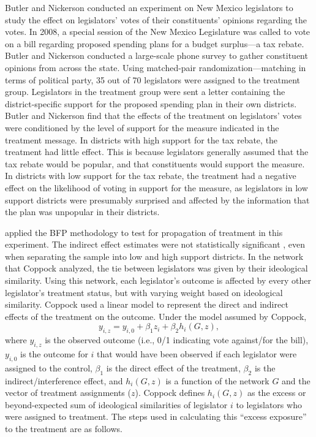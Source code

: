 \documentclass[12pt]{article}
\begin{document}
Butler and Nickerson conducted an experiment on New Mexico legislators to study the effect on legislators' votes of their constituents' opinions regarding the votes. In 2008, a special session of the New Mexico Legislature was called to vote on a bill regarding proposed spending plans for a budget surplus---a tax rebate. Butler and Nickerson conducted a large-scale phone survey to gather constituent opinions from across the state. Using matched-pair randomization---matching in terms of political party, 35 out of 70 legislators were assigned to the treatment group. Legislators in the treatment group were sent a letter containing the district-specific support for the proposed spending plan in their own districts. Butler and Nickerson find that the effects of the treatment on legislators' votes were conditioned by the level of support for the measure indicated in the treatment message. In districts with high support for the tax rebate, the treatment had little effect. This is because legislators generally assumed that the tax rebate would be popular, and that constituents would support the measure. In districts with low support for the tax rebate, the treatment had a negative effect on the likelihood of voting in support for the measure, as legislators in low support districts were presumably surprised and affected by the information that the plan was unpopular in their districts.

\citet{coppock2014information} applied the BFP methodology to test for propagation of treatment in this experiment. The indirect effect estimates were not statistically significant \citep{coppock2016information}, even when separating the sample into low and high support districts. In the network that Coppock analyzed, the tie between legislators was given by their ideological similarity.  Using this network, each legislator's outcome is affected by every other legislator's treatment status, but with varying weight based on ideological similarity. Coppock used a linear model to represent the direct and indirect effects of the treatment on the outcome. Under the model assumed by Coppock, $$y_{i,z} = y_{i,0}+\beta_1z_i+\beta_2h_i(G,z),$$ where $y_{i,z}$ is the observed outcome (i.e., 0/1 indicating vote against/for the bill), $y_{i,0}$ is the outcome for $i$ that would have been observed if each legislator were assigned to the control, $\beta_1$ is the direct effect of the treatment, $\beta_2$ is the indirect/interference effect, and $h_i(G,z)$ is a function of the network $G$ and the vector of treatment assignments ($z$). Coppock defines $h_i(G,z)$ as the excess or beyond-expected sum of ideological similarities of legislator $i$ to legislators who were assigned to treatment. The steps used in calculating this ``excess exposure'' to the treatment are as follows.
\end{document}
